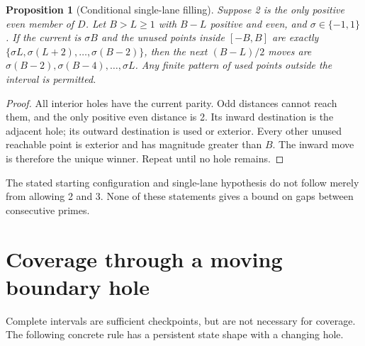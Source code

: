 \documentclass[11pt,a4paper]{article}
\newtheorem{proposition}[theorem]{Proposition}
\begin{document}
\begin{proposition}[Conditional single-lane filling]\label{prop:lane-fill}
Suppose 2 is the only positive even member of $D$. Let $B>L\ge1$ with
$B-L$ positive and even, and $\sigma\in\{-1,1\}$. If the current is
$\sigma B$ and the unused points inside $[-B,B]$ are exactly
$\{\sigma L,\sigma(L+2),\ldots,\sigma(B-2)\}$, then the next
$(B-L)/2$ moves are $\sigma(B-2),\sigma(B-4),\ldots,\sigma L$.
Any finite pattern of used points outside the interval is permitted.
\end{proposition}
\begin{proof}
All interior holes have the current parity. Odd distances cannot reach
them, and the only positive even distance is 2. Its inward destination
is the adjacent hole; its outward destination is used or exterior.
Every other unused reachable point is exterior and has magnitude greater
than $B$. The inward move is therefore the unique winner. Repeat until
no hole remains.
\end{proof}
The stated starting configuration and single-lane hypothesis do not follow merely
from allowing 2 and 3. None of these statements gives a bound on gaps between consecutive primes.

\section{Coverage through a moving boundary hole}\label{sec:repair}
Complete intervals are sufficient checkpoints, but are not necessary for coverage.
The following concrete rule has a persistent state shape with a changing hole.
\end{document}
